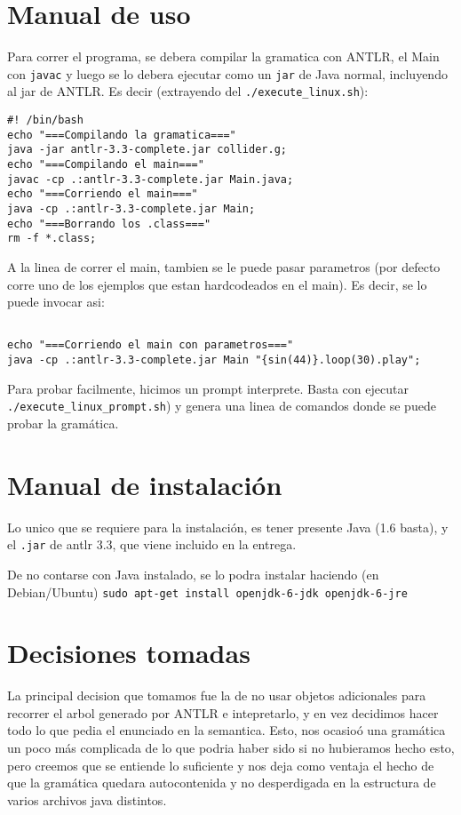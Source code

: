 \documentclass[a4paper]{article}
\begin{document}
\section{Manual de uso}
Para correr el programa, se debera compilar la gramatica con ANTLR, el Main con \texttt{javac} y luego
se lo debera ejecutar como un \texttt{jar}  de Java normal, incluyendo al jar de ANTLR. Es decir (extrayendo del
\texttt{./execute\_linux.sh}): 
\begin{verbatim}
#! /bin/bash
echo "===Compilando la gramatica==="
java -jar antlr-3.3-complete.jar collider.g;
echo "===Compilando el main==="
javac -cp .:antlr-3.3-complete.jar Main.java;
echo "===Corriendo el main==="
java -cp .:antlr-3.3-complete.jar Main;
echo "===Borrando los .class==="
rm -f *.class;
\end{verbatim}
A la linea de correr el main, tambien se le puede pasar parametros (por 
defecto corre uno de los ejemplos que estan hardcodeados en el main). 
Es decir, se lo puede invocar asi:
\begin{verbatim}

echo "===Corriendo el main con parametros==="
java -cp .:antlr-3.3-complete.jar Main "{sin(44)}.loop(30).play";
\end{verbatim}

Para probar facilmente, hicimos un prompt interprete. Basta con ejecutar
\texttt{./execute\_linux\_prompt.sh}) y genera una linea de comandos donde se puede probar la gram\'atica.

\section{Manual de instalaci\'on}
Lo unico que se requiere para la instalaci\'on, es tener presente Java (1.6 basta),
y el \texttt{.jar} de antlr 3.3, que viene incluido en la entrega.

De no contarse con Java instalado, se lo podra instalar haciendo (en Debian/Ubuntu)
\hbox{\texttt{sudo apt-get install openjdk-6-jdk openjdk-6-jre }}

\section{Decisiones tomadas}
La principal decision que tomamos fue la de no usar objetos adicionales para
recorrer el arbol generado por ANTLR e intepretarlo, y en vez decidimos hacer
todo lo que pedia el enunciado en la semantica. Esto, nos ocasio\'o una gram\'atica
un poco m\'as complicada de lo que podria haber sido si no hubieramos hecho esto,
pero creemos que se entiende lo suficiente y nos deja como ventaja el hecho
de que la gram\'atica quedara autocontenida y no desperdigada en la estructura
de varios archivos java distintos.
\end{document}
